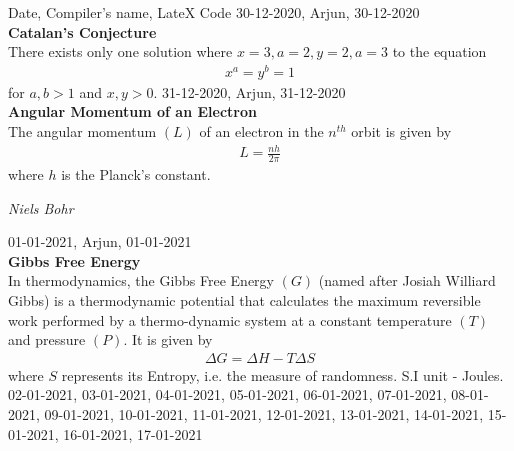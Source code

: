 Date, Compiler's name, LateX Code
30-12-2020, Arjun, 30-12-2020\\ \textbf{Catalan's Conjecture}\\ There exists only one solution where $x=3, a=2, y=2, a=3$ to the equation \begin{align*} x^a = y^b = 1\end{align*} for $a,b > 1$ and $x,y > 0$.
31-12-2020, Arjun, 31-12-2020\\ \textbf{Angular Momentum of an Electron}\\ The angular momentum $(L)$ of an electron in the $n^{th}$ orbit is given by \begin{align*} L = \frac{nh}{2\pi} \end{align*} where $h$ is the Planck's constant. \begin{flushright} \textit{Niels Bohr} \end{flushright}
01-01-2021, Arjun, 01-01-2021\\ \textbf{Gibbs Free Energy}\\ In thermodynamics, the Gibbs Free Energy $(G)$ (named after Josiah Williard Gibbs) is a thermodynamic potential that calculates the maximum reversible work  performed by a thermo-dynamic system at a constant temperature $(T)$ and pressure $(P)$. It is given by \begin{align*} \Delta G=\Delta H-T\Delta S \end{align*} where $S$ represents its Entropy, i.e. the measure of randomness. S.I unit - Joules.
02-01-2021,
03-01-2021,
04-01-2021,
05-01-2021,
06-01-2021,
07-01-2021,
08-01-2021,
09-01-2021,
10-01-2021,
11-01-2021,
12-01-2021,
13-01-2021,
14-01-2021,
15-01-2021,
16-01-2021,
17-01-2021
